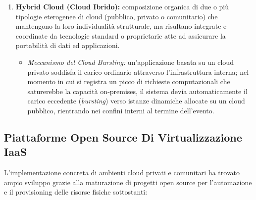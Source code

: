 \documentclass[11pt, a4paper]{article}
\begin{document}
\begin{enumerate}
    \item \textbf{Hybrid Cloud (Cloud Ibrido):} composizione organica di due o più tipologie eterogenee di cloud (pubblico, privato o comunitario) che mantengono la loro individualità strutturale, ma risultano integrate e coordinate da tecnologie standard o proprietarie atte ad assicurare la portabilità di dati ed applicazioni.
    \begin{itemize}[noitemsep]
        \item \emph{Meccanismo del Cloud Bursting:} un'applicazione basata su un cloud privato soddisfa il carico ordinario attraverso l'infrastruttura interna; nel momento in cui si registra un picco di richieste computazionali che saturerebbe la capacità on-premises, il sistema devia automaticamente il carico eccedente (\emph{bursting}) verso istanze dinamiche allocate su un cloud pubblico, rientrando nei confini interni al termine dell'evento.
    \end{itemize}
\end{enumerate}


\subsection{Piattaforme Open Source Di Virtualizzazione IaaS}

L'implementazione concreta di ambienti cloud privati e comunitari ha trovato ampio sviluppo grazie alla maturazione di progetti open source per l'automazione e il provisioning delle risorse fisiche sottostanti:
\end{document}
